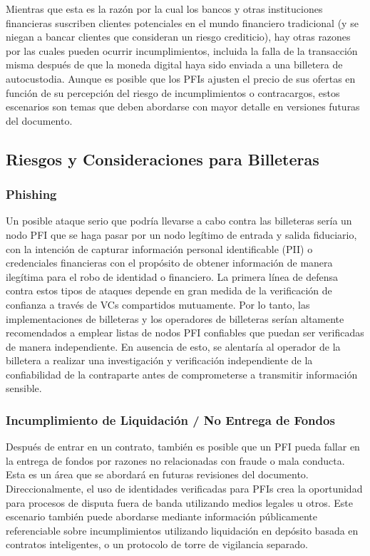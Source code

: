 \documentclass[11pt]{article}
\begin{document}
\vspace{1\baselineskip}
Mientras que esta es la razón por la cual los bancos y otras instituciones financieras suscriben clientes potenciales en el mundo financiero tradicional (y se niegan a bancar clientes que consideran un riesgo crediticio), hay otras razones por las cuales pueden ocurrir incumplimientos, incluida la falla de la transacción misma después de que la moneda digital haya sido enviada a una billetera de autocustodia. Aunque es posible que los PFIs ajusten el precio de sus ofertas en función de su percepción del riesgo de incumplimientos o contracargos, estos escenarios son temas que deben abordarse con mayor detalle en versiones futuras del documento.

\vspace{1\baselineskip}
\subsection{Riesgos y Consideraciones para Billeteras}

\subsubsection{Phishing}

Un posible ataque serio que podría llevarse a cabo contra las billeteras sería un nodo PFI que se haga pasar por un nodo legítimo de entrada y salida fiduciario, con la intención de capturar información personal identificable (PII) o credenciales financieras con el propósito de obtener información de manera ilegítima para el robo de identidad o financiero. La primera línea de defensa contra estos tipos de ataques depende en gran medida de la verificación de confianza a través de VCs compartidos mutuamente. Por lo tanto, las implementaciones de billeteras y los operadores de billeteras serían altamente recomendados a emplear listas de nodos PFI confiables que puedan ser verificadas de manera independiente. En ausencia de esto, se alentaría al operador de la billetera a realizar una investigación y verificación independiente de la confiabilidad de la contraparte antes de comprometerse a transmitir información sensible.

\subsubsection{Incumplimiento de Liquidación / No Entrega de Fondos}

Después de entrar en un contrato, también es posible que un PFI pueda fallar en la entrega de fondos por razones no relacionadas con fraude o mala conducta. Esta es un área que se abordará en futuras revisiones del documento. Direccionalmente, el uso de identidades verificadas para PFIs crea la oportunidad para procesos de disputa fuera de banda utilizando medios legales u otros. Este escenario también puede abordarse mediante información públicamente referenciable sobre incumplimientos utilizando liquidación en depósito basada en contratos inteligentes, o un protocolo de torre de vigilancia separado. \ \ \ \ \ \ \ \ \ \ \ \ \ \ \ \ \ \ \ \ \ \ \ \ \ \ \ \ \ \ \ \ \ \ \ \ \ \ \ \ \ \ \ \ \ \ \ \ \ \ 
\end{document}
